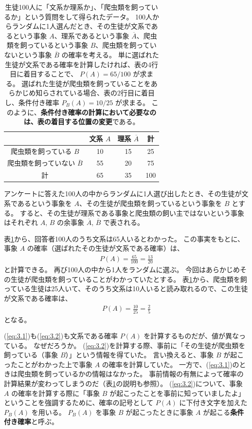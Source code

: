 \documentclass[12pt]{ltjsarticle}\usepackage{ifthen}\newcounter{enlarge}\setcounter{enlarge}{1}
\begin{document}
\begin{table}[tb]
\captionsetup{width=.9\linewidth}
\caption{%
  生徒100人に「文系か理系か」、「爬虫類を飼っているか」という質問をして得られたデータ。
  100人からランダムに1人選んだとき、その生徒が文系であるという事象 $A$、理系であるという事象 $\overline{A}$、爬虫類を飼っているという事象 $B$、爬虫類を飼っていないという事象 $\overline{B}$ の確率を考える。
  単に選ばれた生徒が文系である確率を計算したければ、表の4行目に着目することで、 $P(A) = 65/100$ が求まる。
  選ばれた生徒が爬虫類を飼っていることをあらかじめ知らされている場合、表の2行目に着目し、条件付き確率 $P_B (A) = 10/25$ が求まる。
  このように、\textbf{条件付き確率の計算において必要なのは、表の着目する位置の変更}である。
}
\label{t:3.1}
\centering
\begin{tabular}{c|cc|c} \hline
 & 文系 $A$ & 理系 $\overline{A}$ & 計 \\ \hline
爬虫類を飼っている $B$ & 10 & 15 & 25 \\
爬虫類を飼っていない $\overline{B}$ & 55 & 20 & 75 \\ \hline
計 & 65 & 35 & 100 \\ \hline
\end{tabular}    
\end{table}

アンケートに答えた100人の中からランダムに1人選び出したとき、その生徒が文系であるという事象を $A$、その生徒が爬虫類を飼っているという事象を $B$ とする。
すると、その生徒が理系である事象と爬虫類の飼い主ではないという事象はそれぞれ $A$, $B$ の余事象 $\overline{A}$, $\overline{B}$ で表される。

表\ref{t:3.1}から、回答者100人のうち文系は65人いるとわかった。
この事実をもとに、事象 $A$ の確率（選ばれたその生徒が文系である確率）は、
\begin{align}
  P(A) = \frac{65}{100} = \frac{13}{20} \label{eq:3.1}
\end{align}
と計算できる。
再び100人の中から1人をランダムに選ぶ。
今回はあらかじめその生徒が爬虫類を飼っていることがわかっていたとする。
表\ref{t:3.1}から、爬虫類を飼っている生徒は25人いて、そのうち文系は10人いると読み取れるので、この生徒が文系である確率は、
\begin{align}
  P(A) = \frac{10}{25} = \frac{2}{5} \label{eq:3.2}
\end{align}
となる。

(\ref{eq:3.1})も(\ref{eq:3.2})も文系である確率 $P(A)$ を計算するものだが、値が異なっている。
なぜだろうか。
(\ref{eq:3.2})を計算する際、事前に「その生徒が爬虫類を飼っている（事象 $B$）」という情報を得ていた。
言い換えると、事象 $B$ が起こったことがわかった上で事象 $A$ の確率を計算していた。
一方で、(\ref{eq:3.1})のときは爬虫類を飼っているかの情報はなかった。
事前情報の有無によって確率の計算結果が変わってしまうのだ（表\ref{t:3.1}の説明も参照）。
(\ref{eq:3.2})について、事象 $A$ の確率を計算する際に「事象 $B$ が起こったことを事前に知っていましたよ」ということを強調するために、確率の記号として $P(A)$ に下付き文字を加えた $P_B (A)$ を用いる。
$P_B (A)$ を事象 $B$ が起こったときに事象 $A$ が起こる\textbf{条件付き確率}と呼ぶ。
\end{document}
